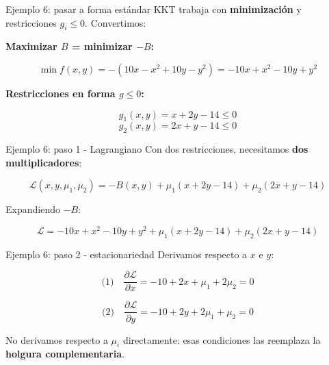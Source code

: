 \documentclass{beamer}
\begin{document}
\begin{frame}{Ejemplo 6: pasar a forma estándar}
    \small
    KKT trabaja con \textbf{minimización} y restricciones $g_i \leq 0$. Convertimos:

    \vspace{0.3em}

    \textbf{Maximizar $B$ = minimizar $-B$:}

    \[
    \min f(x, y) = -(10x - x^2 + 10y - y^2) = -10x + x^2 - 10y + y^2
    \]

    \vspace{0.3em}

    \textbf{Restricciones en forma $g \leq 0$:}

    \[
    g_1(x, y) = x + 2y - 14 \leq 0
    \]
    \[
    g_2(x, y) = 2x + y - 14 \leq 0
    \]
\end{frame}

\begin{frame}{Ejemplo 6: paso 1 - Lagrangiano}
    \small
    Con dos restricciones, necesitamos \textbf{dos multiplicadores}:

    \[
    \mathcal{L}(x, y, \mu_1, \mu_2) = -B(x,y) + \mu_1(x + 2y - 14) + \mu_2(2x + y - 14)
    \]

    \vspace{0.5em}

    Expandiendo $-B$:

    \[
    \mathcal{L} = -10x + x^2 - 10y + y^2 + \mu_1(x + 2y - 14) + \mu_2(2x + y - 14)
    \]
\end{frame}

\begin{frame}{Ejemplo 6: paso 2 - estacionariedad}
    \small
    Derivamos respecto a $x$ e $y$:

    \[
    \text{(1)} \quad \frac{\partial \mathcal{L}}{\partial x} = -10 + 2x + \mu_1 + 2\mu_2 = 0
    \]

    \[
    \text{(2)} \quad \frac{\partial \mathcal{L}}{\partial y} = -10 + 2y + 2\mu_1 + \mu_2 = 0
    \]

    \vspace{0.5em}

    No derivamos respecto a $\mu_i$ directamente: esas condiciones las reemplaza la \textbf{holgura complementaria}.
\end{frame}
\end{document}
